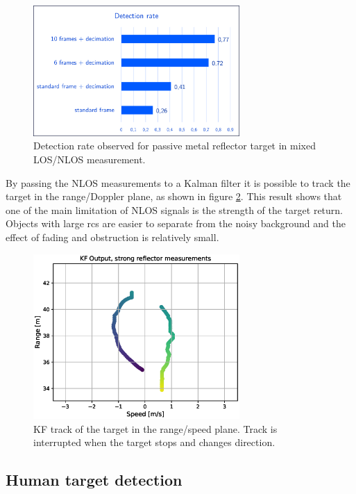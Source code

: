 \begin{figure}[H]
	\centering
	\includegraphics[width=0.7\textwidth]{Images/Test1/detect_hist/detect_hist_cabinet_LMsans.png}
	\caption{\small Detection rate observed for passive metal reflector target in mixed LOS/NLOS measurement.}
	\label{fig:Test1_detect_rate_strong_ref}
\end{figure}
By passing the NLOS measurements to a Kalman filter it is possible to track the target in the range/Doppler plane, as shown in figure \ref{fig:Test1_kf_track_strong_ref}. This result shows that one of the main limitation of NLOS signals is the strength of the target return. Objects with large \gls{rcs} are easier to separate from the noisy background and the effect of fading and obstruction is relatively small.
\begin{figure}[H]
	\centering
	\includegraphics[width=0.7\textwidth]{Images/Test1/kf_track.eps}
	\caption{\small KF track of the target in the range/speed plane. Track is interrupted when the target stops and changes direction.}
	\label{fig:Test1_kf_track_strong_ref}
\end{figure}


\subsection{Human target detection}

